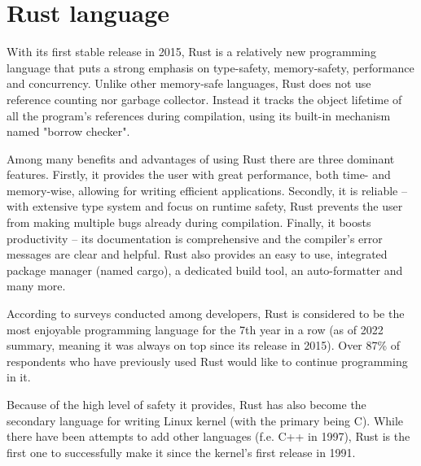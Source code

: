 \documentclass[licencjacka,en]{pracamgr}
\begin{document}
\section{Rust language}

With its first stable release in 2015, Rust is a relatively new programming language that
puts a strong emphasis on type-safety, memory-safety, performance and concurrency. Unlike
other memory-safe languages, Rust does not use reference counting nor garbage collector.
Instead it tracks the object lifetime of all the program's references during compilation,
using its built-in mechanism named "borrow checker".

Among many benefits and advantages of using Rust there are three dominant features. Firstly,
it provides the user with great performance, both time- and memory-wise, allowing for
writing efficient applications. Secondly, it is reliable -- with extensive type system and
focus on runtime safety, Rust prevents the user from making multiple bugs
already during compilation. Finally, it boosts productivity -- its documentation is
comprehensive and the compiler's error messages are clear and helpful. Rust also provides
an easy to use, integrated package manager (named cargo), a dedicated build tool,
an auto-formatter and many more.

According to surveys conducted among developers, Rust is considered to be the most enjoyable
programming language for the 7th year in a row (as of 2022 summary, meaning it was always on top
since its release in 2015). Over 87\% of respondents who have previously used Rust would
like to continue programming in it.

Because of the high level of safety it provides, Rust has also become the secondary
language for writing Linux kernel (with the primary being C). While there have been
attempts to add other languages (f.e. C++ in 1997), Rust is the first one to successfully
make it since the kernel's first release in 1991.

\end{document}
